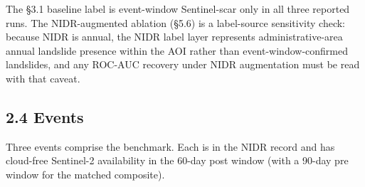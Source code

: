 \documentclass[11pt,a4paper]{article}
\begin{document}
The §3.1 baseline label is event-window Sentinel-scar only in all three reported runs. The NIDR-augmented ablation (§5.6) is a label-source sensitivity check: because NIDR is annual, the NIDR label layer represents administrative-area annual landslide presence within the AOI rather than event-window-confirmed landslides, and any ROC-AUC recovery under NIDR augmentation must be read with that caveat.

\subsection{2.4 Events}\label{events}

Three events comprise the benchmark. Each is in the NIDR record and has cloud-free Sentinel-2 availability in the 60-day post window (with a 90-day pre window for the matched composite).
\end{document}
